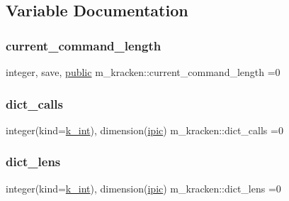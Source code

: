 \subsection{Variable Documentation}
\mbox{\label{namespacem__kracken_ab43d490209ce4f08f9a2c563b1a80d9a}} 
\subsubsection{\texorpdfstring{current\+\_\+command\+\_\+length}{current\_command\_length}}
{\footnotesize\ttfamily integer, save, \hyperlink{M__stopwatch_83_8txt_a2f74811300c361e53b430611a7d1769f}{public} m\+\_\+kracken\+::current\+\_\+command\+\_\+length =0}

\mbox{\label{namespacem__kracken_a02bb6de9fee41e706f457133a906675e}} 
\subsubsection{\texorpdfstring{dict\+\_\+calls}{dict\_calls}}
{\footnotesize\ttfamily integer(kind=\hyperlink{namespacem__kracken_ae51c6f835203dd09fc3be239fc9d0ce1}{k\+\_\+int}), dimension(\hyperlink{namespacem__kracken_a447be9e6b10e207b63049215d9274774}{ipic}) m\+\_\+kracken\+::dict\+\_\+calls =0\hspace{0.3cm}{\ttfamily [private]}}

\mbox{\label{namespacem__kracken_a8c7408a65bf208a0d706023a254db206}} 
\subsubsection{\texorpdfstring{dict\+\_\+lens}{dict\_lens}}
{\footnotesize\ttfamily integer(kind=\hyperlink{namespacem__kracken_ae51c6f835203dd09fc3be239fc9d0ce1}{k\+\_\+int}), dimension(\hyperlink{namespacem__kracken_a447be9e6b10e207b63049215d9274774}{ipic}) m\+\_\+kracken\+::dict\+\_\+lens =0\hspace{0.3cm}{\ttfamily [private]}}

